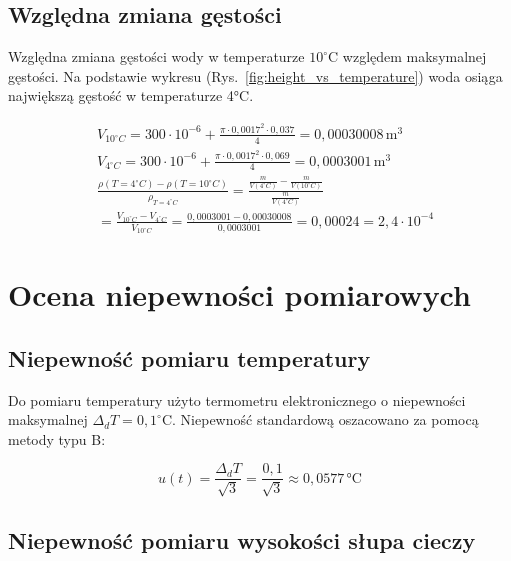 \documentclass[a4paper,12pt]{article}
\begin{document}
\subsection{Względna zmiana gęstości}

Względna zmiana gęstości wody w temperaturze $10^\circ$C względem maksymalnej gęstości. Na podstawie wykresu (Rys.~\ref{fig:height_vs_temperature}) woda osiąga największą gęstość w temperaturze 4°C.

\begin{align*}
     & V_{10^\circ C} = 300 \cdot 10^{-6} + \frac{\pi \cdot 0{,}0017^2 \cdot 0{,}037}{4} = 0{,}00030008\,\text{m}^3                                        \\
     & V_{4^\circ C} = 300 \cdot 10^{-6} + \frac{\pi \cdot 0{,}0017^2 \cdot 0{,}069}{4} = 0{,}0003001\,\text{m}^3                                          \\
     & \frac{\rho(T=4^\circ C) - \rho(T=10^\circ C)}{\rho_{T=4^\circ C}} = \frac{\frac{m}{V(4^\circ C)} - \frac{m}{V(10^\circ C)}}{\frac{m}{V(4^\circ C)}} \\
     & = \frac{V_{10^\circ C} - V_{4^\circ C}}{V_{10^\circ C}} = \frac{0{,}0003001 - 0{,}00030008}{0{,}0003001} = 0{,}00024 = 2{,}4 \cdot 10^{-4}
\end{align*}

\section{Ocena niepewności pomiarowych}

\subsection{Niepewność pomiaru temperatury}

Do pomiaru temperatury użyto termometru elektronicznego o niepewności maksymalnej $\Delta_d T = 0{,}1^\circ$C. Niepewność standardową oszacowano za pomocą metody typu B:

\begin{equation}
    u(t) = \frac{\Delta_d T}{\sqrt{3}} = \frac{0{,}1}{\sqrt{3}} \approx 0{,}0577\,\text{°C}
\end{equation}

\subsection{Niepewność pomiaru wysokości słupa cieczy}
\end{document}
